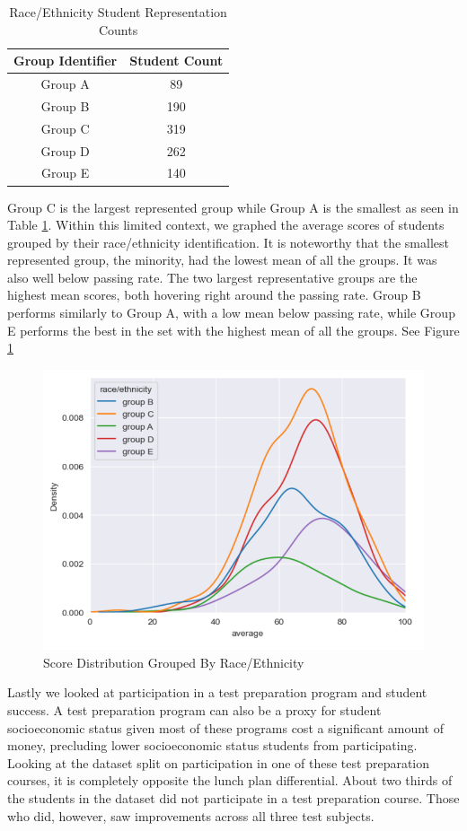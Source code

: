 \documentclass[doc]{apa6} %
\begin{document}
\begin{table}[H]
    \centering
    \begin{tabular}{|c|c|}
    \hline
         Group Identifier & Student Count\\
         \hline\hline
         Group A & 89\\
         \hline
         Group B & 190\\
         \hline
         Group C & 319\\
         \hline
         Group D & 262\\
         \hline
         Group E & 140\\
         \hline
    \end{tabular}
    \caption{Race/Ethnicity Student Representation Counts}
    \label{tab:RaceCount}
\end{table}
Group C is the largest represented group while Group A is the smallest as seen in Table \ref{tab:RaceCount}. Within this limited context, we graphed the average scores of students grouped by their race/ethnicity identification. It is noteworthy that the smallest represented group, the minority, had the lowest mean of all the groups. It was also well below passing rate.  The two largest representative groups are the highest mean scores, both hovering right around the passing rate. Group B performs similarly to Group A, with a low mean below passing rate, while Group E performs the best in the set with the highest mean of all the groups. See Figure \ref{fig:RaceScores}

\begin{figure}[H]
    \centering
    \includegraphics[width=0.5\linewidth]{RaceScoreDistribution.png}
    \caption{Score Distribution Grouped By Race/Ethnicity}
    \label{fig:RaceScores}
\end{figure}

Lastly we looked at participation in a test preparation program and student success.  A test preparation program can also be a proxy for student socioeconomic status given most of these programs cost a significant amount of money, precluding lower socioeconomic status students from participating.
Looking at the dataset split on participation in one of these test preparation courses, it is completely opposite the lunch plan differential. About two thirds of the students in the dataset did not participate in a test preparation course.  Those who did, however, saw improvements across all three test subjects.
\end{document}
